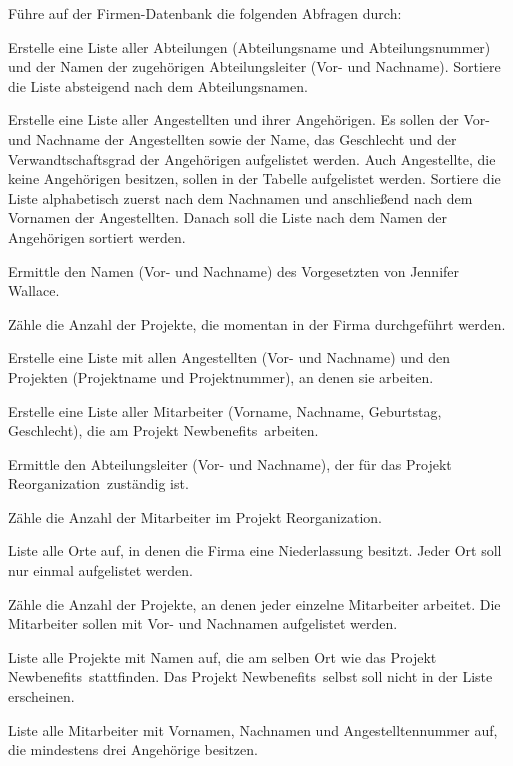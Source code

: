 Führe auf der Firmen-Datenbank die folgenden Abfragen durch:

\begin{compactenum}[a)] 
\item Erstelle eine Liste aller Abteilungen (Abteilungsname und
Abteilungsnummer) und der Namen der zugehörigen Abteilungsleiter (Vor- und
Nachname). Sortiere die Liste absteigend nach dem Abteilungsnamen.

\item Erstelle eine Liste aller Angestellten und ihrer Angehörigen. Es sollen
der Vor- und Nachname der Angestellten sowie der Name, das Geschlecht und der
Verwandtschaftsgrad der Angehörigen aufgelistet werden. Auch Angestellte, die
keine Angehörigen besitzen, sollen in der Tabelle aufgelistet werden.
Sortiere die Liste alphabetisch zuerst nach dem Nachnamen und anschließend nach
dem Vornamen der Angestellten. Danach soll die Liste nach dem Namen der
Angehörigen sortiert werden.

\item Ermittle den Namen (Vor- und Nachname) des Vorgesetzten von Jennifer
Wallace.

\item Zähle die Anzahl der Projekte, die momentan in der Firma durchgeführt
werden.

\item Erstelle eine Liste mit allen Angestellten (Vor- und Nachname) und den
Projekten (Projektname und Projektnummer), an denen sie arbeiten.

\item Erstelle eine Liste aller Mitarbeiter (Vorname, Nachname, Geburtstag,
Geschlecht), die am Projekt \glqq Newbenefits\grqq\ arbeiten.

\item Ermittle den Abteilungsleiter (Vor- und Nachname), der für das Projekt
\glqq Reorganization\grqq\ zuständig ist.

\item Zähle die Anzahl der Mitarbeiter im Projekt \glqq Reorganization\grqq .

\item Liste alle Orte auf, in denen die Firma eine Niederlassung besitzt. Jeder
Ort soll nur einmal aufgelistet werden.

\item Zähle die Anzahl der Projekte, an denen jeder einzelne Mitarbeiter
arbeitet. Die Mitarbeiter sollen mit Vor- und Nachnamen aufgelistet werden.

\item Liste alle Projekte mit Namen auf, die am selben Ort wie das Projekt
\glqq Newbenefits\grqq\ stattfinden. Das Projekt \glqq Newbenefits\grqq\ selbst
soll nicht in der Liste erscheinen.

\item Liste alle Mitarbeiter mit Vornamen, Nachnamen und Angestelltennummer
auf, die mindestens drei Angehörige besitzen.
\end{compactenum}
